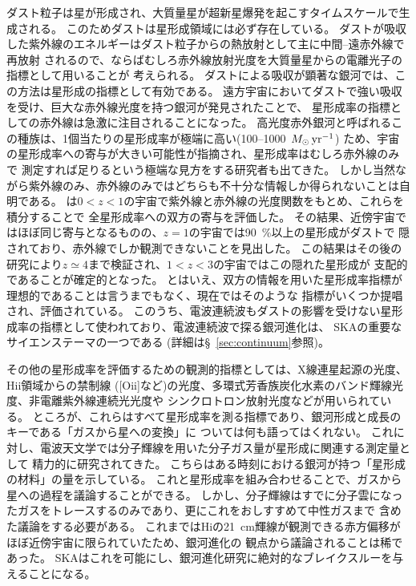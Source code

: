 ダスト粒子は星が形成され、大質量星が超新星爆発を起こすタイムスケールで生成される。
このためダストは星形成領域には必ず存在している。
ダストが吸収した紫外線のエネルギーはダスト粒子からの熱放射として主に中間--遠赤外線で再放射
されるので、ならばむしろ赤外線放射光度を大質量星からの電離光子の指標として用いることが
考えられる\citep[e.g.][]{1998ARA&A..36..189K}。
ダストによる吸収が顕著な銀河では、この方法は星形成の指標として有効である。
遠方宇宙においてダストで強い吸収を受け、巨大な赤外線光度を持つ銀河が発見されたことで、
星形成率の指標としての赤外線は急激に注目されることになった\citep[e.g.][]{hughes1998}。
高光度赤外銀河と呼ばれるこの種族は、1個当たりの星形成率が極端に高い(100--1000~$M_\odot\,{\rm yr}^{-1}$)
ため、宇宙の星形成率への寄与が大きい可能性が指摘され、星形成率はむしろ赤外線のみで
測定すれば足りるという極端な見方をする研究者も出てきた。
しかし当然ながら紫外線のみ、赤外線のみではどちらも不十分な情報しか得られないことは自明である。
\citet{takeuchi2005}は$0 < z < 1$の宇宙で紫外線と赤外線の光度関数をもとめ、これらを積分することで
全星形成率への双方の寄与を評価した。
その結果、近傍宇宙ではほぼ同じ寄与となるものの、$z=1$の宇宙では90~\%以上の星形成がダストで
隠されており、赤外線でしか観測できないことを見出した。
この結果はその後の研究により$z \simeq 4$まで検証され、$1 < z < 3$の宇宙ではこの隠れた星形成が
支配的であることが確定的となった\citep[e.g.][]{cucciati2012, burgarella2013}。
とはいえ、双方の情報を用いた星形成率指標が理想的であることは言うまでもなく、現在ではそのような
指標がいくつか提唱され、評価されている\citep[e.g.][]{kennicutt2009,takeuchi2010,murphy2011}。
このうち、電波連続波もダストの影響を受けない星形成率の指標として使われており、電波連続波で探る銀河進化は、
SKAの重要なサイエンステーマの一つである (詳細は\S~\ref{sec:continuum}参照)。

その他の星形成率を評価するための観測的指標としては、X線連星起源の光度、H{\sc ii}領域からの禁制線
([O{\sc ii}]など)の光度、多環式芳香族炭化水素のバンド輝線光度、非電離紫外線連続光光度や
シンクロトロン放射光度などが用いられている。
ところが、これらはすべて星形成率を測る指標であり、銀河形成と成長のキーである「ガスから星への変換」に
ついては何も語ってはくれない。
これに対し、電波天文学では分子輝線を用いた分子ガス量が星形成に関連する測定量として
精力的に研究されてきた。
こちらはある時刻における銀河が持つ「星形成の材料」の量を示している。
これと星形成率を組み合わせることで、ガスから星への過程を議論することができる。
しかし、分子輝線はすでに分子雲になったガスをトレースするのみであり、更にこれをおしすすめて中性ガスまで
含めた議論をする必要がある。
これまではH{\sc i}の21~{\rm cm}輝線が観測できる赤方偏移がほぼ近傍宇宙に限られていたため、銀河進化の
観点から議論されることは稀であった。
SKAはこれを可能にし、銀河進化研究に絶対的なブレイクスルーを与えることになる。


